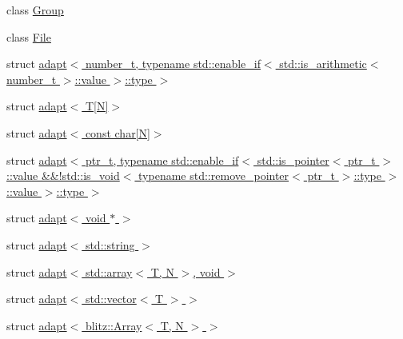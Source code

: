 \begin{DoxyCompactItemize}
class \hyperlink{class_h5_t_l_1_1_group}{Group}
\item 
class \hyperlink{class_h5_t_l_1_1_file}{File}
\item 
struct \hyperlink{struct_h5_t_l_1_1adapt_3_01number__t_00_01typename_01std_1_1enable__if_3_01std_1_1is__arithmetic58ffd9dad45132ac3625c2d53f8565f6}{adapt$<$ number\-\_\-t, typename std\-::enable\-\_\-if$<$ std\-::is\-\_\-arithmetic$<$ number\-\_\-t $>$\-::value $>$\-::type $>$}
\item 
struct \hyperlink{struct_h5_t_l_1_1adapt_3_01_t[_n]_4}{adapt$<$ T\mbox{[}\-N\mbox{]}$>$}
\item 
struct \hyperlink{struct_h5_t_l_1_1adapt_3_01const_01char[_n]_4}{adapt$<$ const char\mbox{[}\-N\mbox{]}$>$}
\item 
struct \hyperlink{struct_h5_t_l_1_1adapt_3_01ptr__t_00_01typename_01std_1_1enable__if_3_01std_1_1is__pointer_3_01p0a19472823b7668f52349b1de2805cc9}{adapt$<$ ptr\-\_\-t, typename std\-::enable\-\_\-if$<$ std\-::is\-\_\-pointer$<$ ptr\-\_\-t $>$\-::value \&\&!std\-::is\-\_\-void$<$ typename std\-::remove\-\_\-pointer$<$ ptr\-\_\-t $>$\-::type $>$\-::value $>$\-::type $>$}
\item 
struct \hyperlink{struct_h5_t_l_1_1adapt_3_01void_01_5_01_4}{adapt$<$ void $\ast$ $>$}
\item 
struct \hyperlink{struct_h5_t_l_1_1adapt_3_01std_1_1string_01_4}{adapt$<$ std\-::string $>$}
\item 
struct \hyperlink{struct_h5_t_l_1_1adapt_3_01std_1_1array_3_01_t_00_01_n_01_4_00_01void_01_4}{adapt$<$ std\-::array$<$ T, N $>$, void $>$}
\item 
struct \hyperlink{struct_h5_t_l_1_1adapt_3_01std_1_1vector_3_01_t_01_4_01_4}{adapt$<$ std\-::vector$<$ T $>$ $>$}
\item 
struct \hyperlink{struct_h5_t_l_1_1adapt_3_01blitz_1_1_array_3_01_t_00_01_n_01_4_01_4}{adapt$<$ blitz\-::\-Array$<$ T, N $>$ $>$}
\end{DoxyCompactItemize}

